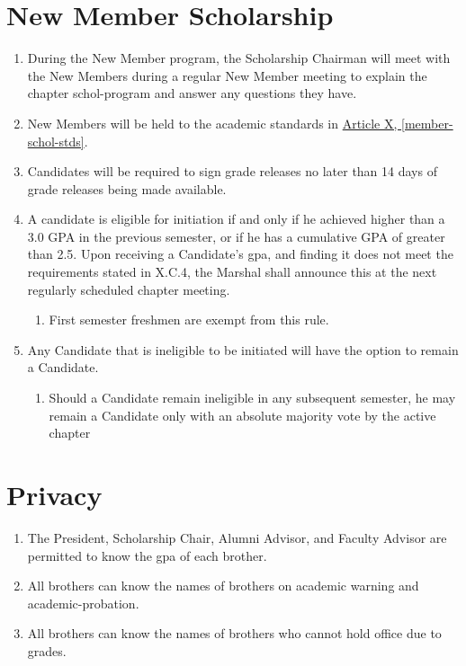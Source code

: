 \section{New Member Scholarship}
	\begin{enumerate}
		\item During the New Member program, the Scholarship Chairman will meet with the New Members during a regular New Member meeting to explain the chapter \Gls{schol-program} and answer any questions they have.
		
		\item New Members will be held to the academic standards in \hyperref[member-schol-stds]{Article X, \autoref*{member-schol-stds}}.

		\item Candidates will be required to sign grade releases no later than 14 days of grade releases being made available.
		
		\item A candidate is eligible for initiation if and only if he achieved higher than a 3.0 GPA in the previous semester, or if he has a cumulative GPA of greater than 2.5. Upon receiving a Candidate's \gls{gpa}, and finding it does not meet the requirements stated in X.C.4, the Marshal shall announce this at the next regularly scheduled chapter meeting.
		
		\begin{enumerate}
			\item First semester freshmen are exempt from this rule.
		\end{enumerate}

		\item Any Candidate that is ineligible to be initiated will have the option to remain a Candidate.

		\begin{enumerate}
			\item Should a Candidate remain ineligible in any subsequent semester, he may remain a Candidate only with an absolute majority vote by the active chapter
		\end{enumerate}

	\end{enumerate}

\section{Privacy}
	\begin{enumerate}
		\item The President, Scholarship Chair, Alumni Advisor, and Faculty Advisor are permitted to know the \gls{gpa} of each brother.

		\item All brothers can know the names of brothers on academic warning and \gls{academic-probation}.

		\item All brothers can know the names of brothers who cannot hold office due to grades.

	\end{enumerate}
